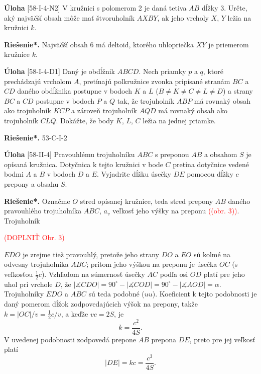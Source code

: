 \documentclass{article}
\newcommand{\rieh}{\textbf{Riešenie*.} }
\newcommand{\ma}{\measuredangle}
\newcommand\todo[1]{\noindent\textcolor{red}{(#1)}}
\newcommand{\problem}[3]{
  \begin{tcolorbox}[breakable,notitle,boxrule=0pt,colback=light-gray,colframe=light-gray]
    \textbf{Úloha}
    [#1] #2
  \end{tcolorbox}
  \noindent#3
}
\begin{document}
\problem{58-I-4-N2}{
V kružnici s polomerom 2 je daná tetiva $AB$ dĺžky 3. Určte, aký najväčší obsah môže
mať štvoruholník $AXBY$, ak jeho vrcholy $X$, $Y$ ležia na kružnici $k$.
}{
\rieh Najväčší obsah 6 má deltoid, ktorého uhlopriečka $XY$ je priemerom kružnice $k$.
}

\problem{58-I-4-D1}{
Daný je obdĺžnik $ABCD$. Nech priamky $p$ a $q$, ktoré prechádzajú vrcholom $A$, pretínajú
polkružnice zvonka pripísané stranám $BC$ a $CD$ daného obdĺžnika postupne v bodoch
$K$ a $L$ ($B\neq K \neq C \neq L \neq D$) a strany $BC$ a $CD$ postupne v bodoch $P$ a $Q$ tak, že trojuholník $ABP$ má rovnaký obsah ako trojuholník $KCP$ a zároveň trojuholník
$AQD$ má rovnaký obsah ako trojuholník $CLQ$. Dokážte, že body $K$, $L$, $C$ ležia na
jednej priamke.
}{
\rieh 53-C-I-2
}

\problem{58-II-4}{
Pravouhlému trojuholníku $ABC$ s preponou $AB$ a obsahom $S$ je opísaná kružnica. Dotyčnica k tejto kružnici v bode $C$ pretína dotyčnice vedené bodmi $A$ a $B$ v bodoch $D$ a $E$. Vyjadrite dĺžku úsečky $DE$ pomocou dĺžky $c$ prepony a obsahu $S$.
}{
\rieh Označme $O$ stred opísanej kružnice, teda stred prepony $AB$ daného pravouhlého trojuholníka $ABC$, $a_v$ veľkosť jeho výšky na preponu \todo{(obr. 3)}. Trojuholník

\todo{DOPLNIŤ Obr. 3}

$EDO$ je zrejme tiež pravouhlý, pretože jeho strany $DO$ a $EO$ sú kolmé na odvesny
trojuholníka $ABC$; pritom jeho výškou na preponu je úsečka $OC$ (s veľkosťou $\frac{1}{2}c$). Vzhľadom na súmernosť úsečky $AC$ podľa osi $OD$ platí pre jeho uhol pri vrchole $D$, že $|\ma CDO| = 90^\circ - |\ma COD| = 90^\circ - |\ma AOD| = \alpha$. Trojuholníky $EDO$ a $ABC$ sú teda
podobné ($uu$). Koeficient k tejto podobnosti je daný pomerom dĺžok zodpovedajúcich
výšok na prepony, takže $k = |OC|/v = \frac{1}{2}c/v$, a keďže $vc = 2S$, je
$$k =\frac{c^2}{4S}.$$
V uvedenej podobnosti zodpovedá prepone $AB$ prepona $DE$, preto pre jej veľkosť platí
$$|DE| = kc =\frac{c^3}{4S}.$$

}
\end{document}
